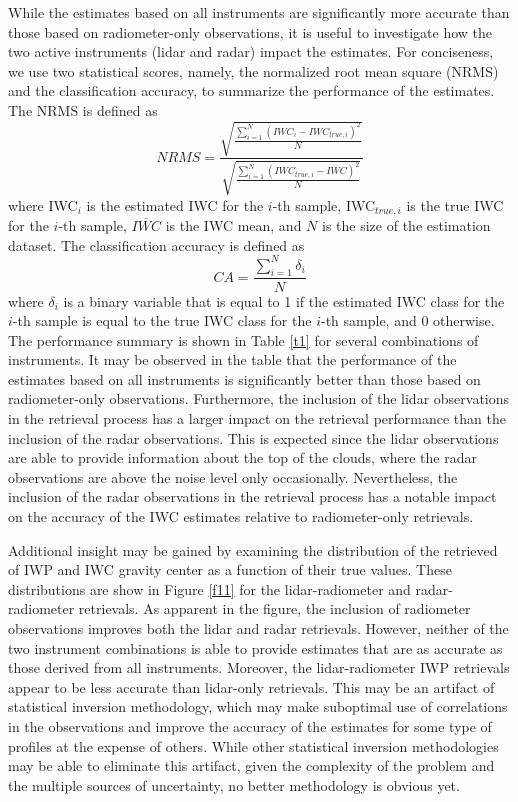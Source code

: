 \documentclass{ametsocV6.1}
\begin{document}
While the estimates based on all instruments are significantly more accurate than those based on radiometer-only
observations, it is useful to investigate how the two active instruments (lidar and radar) impact the
estimates.  For conciseness, we use two statistical scores, namely, the normalized root mean square (NRMS) and
the classification accuracy, to summarize the performance of the estimates.  The NRMS is defined as
\begin{equation}
NRMS=\frac {\sqrt {\frac {\sum_{i=1}^{N} (IWC_{i}-IWC_{true,i})^2} {N}}} {\sqrt {\frac {\sum_{i=1}^{N} (IWC_{true,i}-\overline{IWC})^2} {N}}} 
\end{equation}
where IWC$_{i}$ is the estimated IWC for the $i$-th sample, IWC$_{true,i}$ is the true IWC for the $i$-th sample,
$\overline{IWC}$ is the IWC mean, and $N$ is the size of the estimation dataset.  The classification
accuracy is defined as
\begin{equation}
CA=\frac {\sum_{i=1}^{N} \delta_{i}} {N}
\end{equation}
where $\delta_{i}$ is a binary variable that is equal to 1 if the estimated IWC class for the $i$-th sample is
equal to the true IWC class for the $i$-th sample, and 0 otherwise. The performance summary is shown 
in Table \ref{t1} for several combinations of instruments. It may be observed in the table that the
performance of the estimates based on all instruments is significantly better than those based on
radiometer-only observations.  Furthermore, the inclusion of the lidar observations in the retrieval
process has a larger impact on the retrieval performance than the inclusion of the radar
observations.  This is expected since the lidar observations are able to provide information about the
top of the clouds, where the radar observations are above the noise level only occasionally. Nevertheless,
the inclusion of the radar observations in the retrieval process has a notable impact on the
accuracy of the IWC estimates relative to radiometer-only retrievals. 

Additional insight may be gained by examining the distribution of the retrieved of IWP and IWC gravity center as
a function of their true values.  These distributions are show in Figure \ref{f11} for the lidar-radiometer
and radar-radiometer retrievals.  As apparent in the figure, the inclusion of radiometer observations improves both
the lidar and radar retrievals. However, neither of the two instrument combinations is able to provide estimates
that are as accurate as those derived from all instruments.  Moreover, the lidar-radiometer IWP retrievals appear to be
less accurate than lidar-only retrievals. This may be an artifact of statistical inversion methodology, which may 
make suboptimal use of correlations in the observations and improve the accuracy of the estimates for some type of 
profiles at the expense of others.  While other statistical inversion methodologies may be able to eliminate this
artifact, given the complexity of the problem and the multiple sources of uncertainty, no better methodology is
obvious yet.
\end{document}
